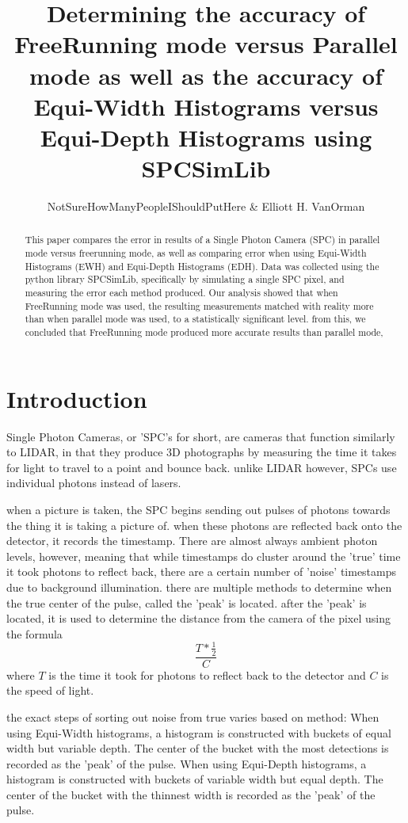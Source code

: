 \documentclass{article}
\title{Determining the accuracy of FreeRunning mode versus Parallel mode as well as the accuracy of Equi-Width Histograms versus Equi-Depth Histograms using SPCSimLib \cite{SPCSimLib}}
\author{NotSureHowManyPeopleIShouldPutHere \& Elliott H. VanOrman}
\begin{document}
\maketitle

\begin{abstract}
This paper compares the error in results of a Single Photon Camera (SPC) in parallel mode versus freerunning mode, as well as comparing error when using Equi-Width Histograms (EWH) and Equi-Depth Histograms (EDH).
Data was collected using the python library SPCSimLib, specifically by simulating a single SPC pixel, and measuring the error each method produced.
Our analysis showed that when FreeRunning mode was used, the resulting measurements matched with reality more than when parallel mode was used, to a statistically significant level.
from this, we concluded that FreeRunning mode produced more accurate results than parallel mode,
\end{abstract}

\section{Introduction}

Single Photon Cameras, or 'SPC's for short, are cameras that function similarly to LIDAR, in that they produce 3D photographs by measuring the time it takes for light to travel to a point and bounce back. unlike LIDAR however, SPCs use individual photons instead of lasers.

when a picture is taken, the SPC begins sending out pulses of photons towards the thing it is taking a picture of. when these photons are reflected back onto the detector, it records the timestamp. There are almost always ambient photon levels, however, meaning that while timestamps do cluster around the 'true' time it took photons to reflect back, there are a certain number of 'noise' timestamps due to background illumination. there are multiple methods to determine when the true center of the pulse, called the 'peak' is located. after the 'peak' is located, it is used to determine the distance from the camera of the pixel using the formula \[\frac{T*\frac{1}{2}}{C}\] where $T$ is the time it took for photons to reflect back to the detector and $C$ is the speed of light.

the exact steps of sorting out noise from true varies based on method: When using Equi-Width histograms, a histogram is constructed with buckets of equal width but variable depth. The center of the bucket with the most detections is recorded as the 'peak' of the pulse. When using Equi-Depth histograms, a histogram is constructed with buckets of variable width but equal depth. The center of the bucket with the thinnest width is recorded as the 'peak' of the pulse.
\end{document}
